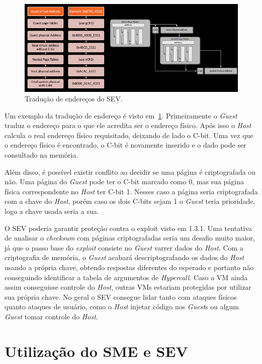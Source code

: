 \documentclass{report}
\begin{document}
\begin{figure}[h]
    \centering
    \includegraphics[width=1\textwidth]{img/sev-address-translation}
    \caption{Tradução de endereços do SEV\@.}\label{sev-address-translation}
\end{figure}

Um exemplo da tradução de endereço é visto em~\ref{sev-address-translation}.
Primeiramente o \textit{Guest} traduz o endereço para o que ele acredita ser o
endereço físico. Após isso o \textit{Host} calcula o real endereço físico
requisitado, deixando de lado o C-bit. Uma vez que o endereço físico é
encontrado, o C-bit é novamente inserido e o dado pode ser consultado na
memória.

Além disso, é possível existir conflito ao decidir se uma página é
criptografada ou não. Uma página do \textit{Guest} pode ter o C-bit marcado
como 0, mas sua página física correspondente no \textit{Host} ter C-bit 1.
Nesses caso a página seria criptografada com a chave do \textit{Host}, porém
caso os dois C-bits sejam 1 o \textit{Guest} teria prioridade, logo a chave
usada seria a sua.

O SEV poderia garantir proteção contra o exploit visto em 1.3.1. Uma tentativa
de analisar o \textit{checksum} com páginas criptografadas seria um desafio
muito maior, já que o passo base do \textit{exploit} consiste no \textit{Guest}
varrer dados do \textit{Host}. Com a criptografia de memória, o \textit{Guest}
acabará descriptografando os dados do \textit{Host} usando a própria chave,
obtendo respostas diferentes do esperado e portanto não conseguindo identificar
a tabela de argumentos de \textit{Hypercall}. Caso a VM ainda assim conseguisse
controle do \textit{Host}, outras VMs estariam protegidas por utilizar sua
própria chave. No geral o SEV consegue lidar tanto com ataques físicos quanto
ataques de usuário, como o \textit{Host} injetar código nos \textit{Guest}s ou
algum \textit{Guest} tomar controle do \textit{Host}.

\section{Utilização do SME e SEV}
\end{document}
